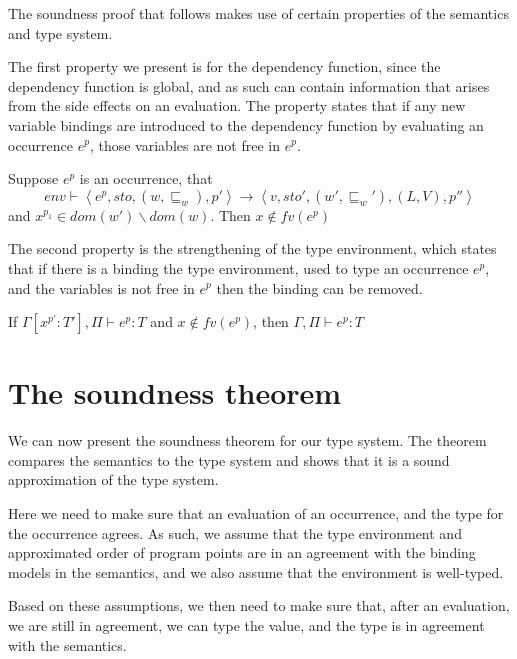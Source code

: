 \documentclass[acmsmall,sigplan]{acmart}
\begin{document}
The soundness proof that follows makes use of certain properties of
the semantics and type system.

The first property we present is for the dependency function, since
the dependency function is global, and as such can contain information
that arises from the side effects on an evaluation. The property
states that if any new variable bindings are introduced to the
dependency function by evaluating an occurrence $e^p$, those
variables are not free in $e^p$.

\begin{lemma}[History]\label{lemma:His}
	Suppose $e^p$ is an occurrence, that
	$$env\vdash\left\langle e^{p},sto,(w,\sqsubseteq_w),p'\right\rangle\rightarrow\left\langle v,sto',(w',\sqsubseteq_w'),(L,V),p''\right\rangle$$
		and $x^{p_1}\in dom(w')\backslash dom(w)$.
		Then $x\notin fv(e^{p})$
\end{lemma}

%

The second property is the strengthening of the type environment, which states that if there is a binding the type environment, used to type an occurrence $e^p$, and the variables is not free in $e^p$ then the binding can be removed.

\begin{lemma}[Strengthening]\label{lemma:Strength}
	If $\Gamma[x^{p'}:T'],\Pi\vdash e^{p}:T$ and $x\notin fv(e^p)$, then $\Gamma,\Pi\vdash e^{p}:T$
\end{lemma}
%

\section{The soundness theorem}

We can now present the soundness theorem for our type system. The
theorem compares the semantics to the type system and shows that it is
a sound approximation of the type system.

Here we need to make sure that an
evaluation of an occurrence, and the type for the occurrence agrees. 
As such, we assume that the type environment and approximated order of
program points are in an agreement with the binding models in the
semantics, and we also assume that the environment is well-typed. 

Based on these assumptions, we then need to make sure that, after an
evaluation, we are still in agreement, we can type the value, and the
type is in agreement with the semantics. 
\end{document}
